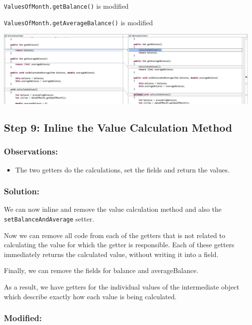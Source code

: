 \documentclass[a4paper,fleqn,titlepage,11pt]{article}
\begin{document}
\texttt{ValuesOfMonth.getBalance()} is modified

\texttt{ValuesOfMonth.getAverageBalance()} is modified


\includegraphics[width=1\textwidth]{CompareViews/07-08-2.jpg}



\subsection*{Step 9: Inline the Value Calculation Method}

\subsubsection*{Observations:}
\begin{itemize}
\item The two getters do the calculations, set the fields and return the values. 
\end{itemize}

\subsubsection*{Solution:}

We can now inline and remove the value calculation method and also the \texttt{setBalanceAndAverage} setter.

Now we can remove all code from each of the getters that is not related to calculating the value for which the getter is responsible. Each of these getters immediately returns the calculated value, without writing it into a field.

Finally, we can remove the fields for balance and averageBalance.

As a result, we have getters for the individual values of the intermediate object which describe exactly how each value is being calculated.

\subsubsection*{Modified:}
\end{document}
